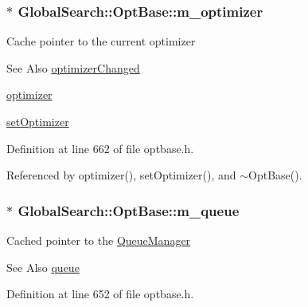 \hypertarget{classGlobalSearch_1_1OptBase_a9bc76450b0d52ab9fc9a4caaf97143b7}{
\subsubsection[{m\-\_\-optimizer}]{$\ast$ Global\-Search\-::\-Opt\-Base\-::m\-\_\-optimizer\hspace{0.3cm}{\ttfamily [protected]}}}\label{classGlobalSearch_1_1OptBase_a9bc76450b0d52ab9fc9a4caaf97143b7}
Cache pointer to the current optimizer \begin{DoxySeeAlso}{See Also}
\hyperlink{classGlobalSearch_1_1OptBase_a8f07729ab8372e2a41de0d38d7947c6a}{optimizer\-Changed} 

\hyperlink{classGlobalSearch_1_1OptBase_a4dce62d15f24d665c807047aa5c618fc}{optimizer} 

\hyperlink{classGlobalSearch_1_1OptBase_addd46a192c8a68553a12b30d18246f1e}{set\-Optimizer} 
\end{DoxySeeAlso}


Definition at line 662 of file optbase.\-h.



Referenced by optimizer(), set\-Optimizer(), and $\sim$\-Opt\-Base().

\hypertarget{classGlobalSearch_1_1OptBase_a187a29ceafe0c4a45ecb7a925267f93a}{
\subsubsection[{m\-\_\-queue}]{$\ast$ Global\-Search\-::\-Opt\-Base\-::m\-\_\-queue\hspace{0.3cm}{\ttfamily [protected]}}}\label{classGlobalSearch_1_1OptBase_a187a29ceafe0c4a45ecb7a925267f93a}
Cached pointer to the \hyperlink{classGlobalSearch_1_1QueueManager}{Queue\-Manager} \begin{DoxySeeAlso}{See Also}
\hyperlink{classGlobalSearch_1_1OptBase_aa10982ae8ea63745203a025b2be8054d}{queue} 
\end{DoxySeeAlso}


Definition at line 652 of file optbase.\-h.



